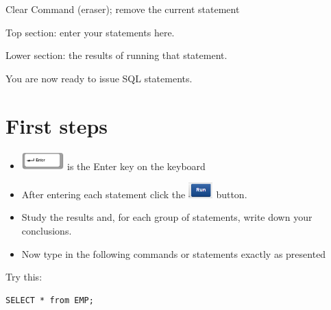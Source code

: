 \begin{center}
\begin{minipage}{2.789cm}
Clear Command (eraser); remove the current statement

\end{minipage}
\end{center}
\begin{center}
\begin{minipage}{4.706cm}
Top section: enter your statements here.
\end{minipage}
\end{center}


\begin{center}
\begin{minipage}{4.944cm}
Lower section: the results of running that statement.
\end{minipage}
\end{center}
You are now ready to issue SQL statements.

\section{First steps}
\begin{itemize}
\item 
\includegraphics[width=1.63cm,height=0.683cm]{images/img (8).png}
  is the Enter key on the keyboard 
\end{itemize}
\begin{itemize}
\item After entering each statement click the 
\includegraphics[width=0.947cm,height=0.607cm]{images/img (9).png}
  button. 
\end{itemize}
\begin{itemize}
\item Study the results and, for each group of statements, write down your conclusions.
\end{itemize}
\begin{itemize}
\item Now type in the following commands or statements exactly as presented
\end{itemize}

Try this:

\begin{lstlisting}
SELECT * from EMP;
\end{lstlisting}

